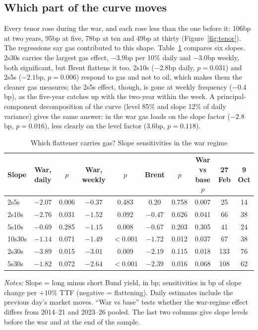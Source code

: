 \documentclass[11pt,a4paper]{article}
\begin{document}
\subsection{Which part of the curve moves}

Every tenor rose during the war, and each rose less than the one before it: 106bp at two years, 95bp at five,
78bp at ten and 49bp at thirty (Figure~\ref{fig:tenor}). The regressions say gas contributed to this shape.
Table~\ref{tab:slopes} compares six slopes. 2s30s carries the largest gas effect, $-$3.9bp per 10\% daily and
$-$3.0bp weekly, both significant, but Brent flattens it too. 2s10s ($-2.8$bp daily, $p=0.031$) and
2s5s ($-2.1$bp, $p=0.006$) respond to gas and not to oil, which makes them the cleaner gas measures; the 2s5s
effect, though, is gone at weekly frequency ($-0.4$bp), as the five-year catches up with the two-year within the
week. A principal-component decomposition of the curve (level 85\% and slope 12\% of daily variance)
gives the same answer: in the war gas loads on the slope factor ($-2.8$bp, $p=0.016$), less clearly on the
level factor ($3.6$bp, $p=0.118$).

\begin{table}[htbp]\centering\scriptsize
\caption{Which flattener carries gas? Slope sensitivities in the war regime}\label{tab:slopes}
\setlength{\tabcolsep}{5pt}
\begin{tabular}{@{}lccccccccc@{}}
\toprule
Slope & War, daily & $p$ & War, weekly & $p$ & Brent & $p$ & War vs base $p$ & 27 Feb & 9 Oct\\\midrule
2s5s & $-2.07$ & 0.006 & $-0.37$ & 0.483 & $0.20$ & 0.758 & 0.007 & 25 & 14\\
2s10s & $-2.76$ & 0.031 & $-1.52$ & 0.092 & $-0.47$ & 0.626 & 0.041 & 66 & 38\\
5s10s & $-0.69$ & 0.285 & $-1.15$ & 0.008 & $-0.67$ & 0.203 & 0.305 & 41 & 24\\
10s30s & $-1.14$ & 0.071 & $-1.49$ & $<0.001$ & $-1.72$ & 0.012 & 0.037 & 67 & 38\\
2s30s & $-3.89$ & 0.015 & $-3.01$ & 0.009 & $-2.19$ & 0.115 & 0.018 & 133 & 76\\
5s30s & $-1.82$ & 0.072 & $-2.64$ & $<0.001$ & $-2.39$ & 0.016 & 0.068 & 108 & 62\\
\bottomrule
\end{tabular}
\par\vspace{4pt}\begin{minipage}{0.92\textwidth}\scriptsize\textit{Notes:} Slope = long minus short Bund yield, in bp; sensitivities in bp of slope change per $+10\%$ TTF (negative = flattening). Daily estimates include the previous day's market moves. ``War vs base'' tests whether the war-regime effect differs from 2014--21 and 2023--26 pooled. The last two columns give slope levels before the war and at the end of the sample.\end{minipage}
\end{table}
\end{document}
